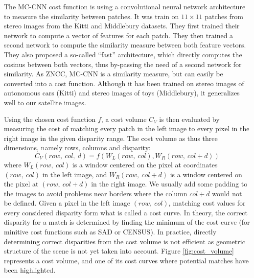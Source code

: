 \begin{example}
	The MC-CNN cost function \cite{zbontar_stereo_2016} is using a convolutional neural network architecture to measure the similarity between patches. It was train on $11\times 11$ patches from stereo images from the Kitti \cite{geiger_vision_2013, menze_object_2015} and Middlebury \cite{scharstein_taxonomy_2001,scharstein_high-accuracy_2003,hirschmuller_evaluation_2007,scharstein_learning_2007,scharstein_high-resolution_2014} datasets. They first trained their network to compute a vector of features for each patch. They then trained a second network to compute the similarity measure between both feature vectors. They also proposed a so-called ``fast'' architecture, which directly computes the cosinus between both vectors, thus by-passing the need of a second network for similarity. As ZNCC, MC-CNN is a similarity measure, but can easily be converted into a cost function. Although it has been trained on stereo images of autonomous cars (Kitti) and stereo images of toys (Middlebury), it generalizes well to our satellite images.
\end{example}
	
Using the chosen cost function $f$, a cost volume $C_V$ is then evaluated by measuring the cost of matching every patch in the left image to every pixel in the right image in the given disparity range. The cost volume as thus three dimensions, namely rows, columns and disparity:
\begin{equation*}
    C_V(row, ~col, ~d) = f(W_L(row, ~col),  W_R(row, ~col+d))
\end{equation*}
where $W_L(row, ~col)$ is a window centered on the pixel at coordinates $(row, ~col)$ in the left image, and $W_R(row, ~col+d)$ is a window centered on the pixel at $(row, ~col+d)$ in the right image. We usually add some padding to the images to avoid problems near borders where the column $col+d$ would not be defined. Given a pixel in the left image $(row, ~col)$, matching cost values for every considered disparity form what is called a cost curve. In theory, the correct disparity for a match is determined by finding the minimum of the cost curve (for minitive cost functions such as SAD or CENSUS). In practice, directly determining correct disparities from the cost volume is not efficient as geometric structure of the scene is not yet taken into account. Figure \ref{fig:cost_volume} represents a cost volume, and one of its cost curves where potential matches have been highlighted. 

